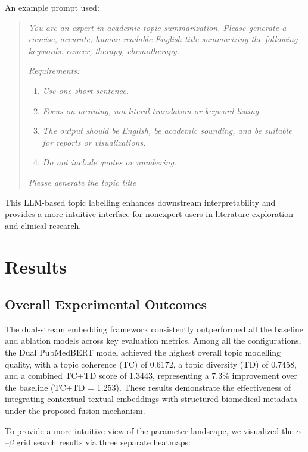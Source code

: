 \documentclass{ieeeaccess}
\begin{document}
An example prompt used:

\begin{quote}
\textit{You are an expert in academic topic summarization. Please generate a concise, accurate, human-readable English title summarizing the following keywords: cancer, therapy, chemotherapy.}

\textit{Requirements:}
\begin{enumerate}
    \item \textit{Use one short sentence.}
    \item \textit{Focus on meaning, not literal translation or keyword listing.}
    \item \textit{The output should be English, be academic sounding, and be suitable for reports or visualizations.}
    \item \textit{Do not include quotes or numbering.}
\end{enumerate}

\textit{Please generate the topic title}
\end{quote}

This LLM-based topic labelling enhances downstream interpretability and provides a more intuitive interface for nonexpert users in literature exploration and clinical research.

\section{Results}

\subsection{Overall Experimental Outcomes}

The dual-stream embedding framework consistently outperformed all the baseline and ablation models across key evaluation metrics. Among all the configurations, the Dual PubMedBERT model achieved the highest overall topic modelling quality, with a topic coherence (TC) of 0.6172, a topic diversity (TD) of 0.7458, and a combined TC+TD score of 1.3443, representing a 7.3\% improvement over the baseline (TC+TD = 1.253). These results demonstrate the effectiveness of integrating contextual textual embeddings with structured biomedical metadata under the proposed fusion mechanism.

To provide a more intuitive view of the parameter landscape, we visualized the $\alpha$--$\beta$ grid search results via three separate heatmaps:
\end{document}
